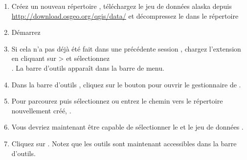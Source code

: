 \begin{enumerate}
   \item Créez un nouveau répertoire , téléchargez le jeu de données \qg alaska  
   depuis \url{http://download.osgeo.org/qgis/data/} et décompressez le dans le répertoire 
  \item Démarrez \qg
  \item Si cela n'a pas déjà été fait dans une précédente session \qg, chargez l'extension \grass 
  en cliquant sur  >  
  et sélectionnez\\ \dropmenuopt{\grass}. La barre d'outils \grass apparaît dans la barre de menu.
  \item Dans la barre d'outils \grass, cliquez sur le bouton  
  pour ouvrir le gestionnaire de .
  \item Pour  parcourez puis sélectionnez ou entrez le chemin vers le répertoire nouvellement créé, .
  \item Vous devriez maintenant être capable de sélectionner le  et le jeu de données .
  \item Cliquez sur . Notez que les outils \grass sont maintenant accessibles dans la barre d'outils.

\end{enumerate}
